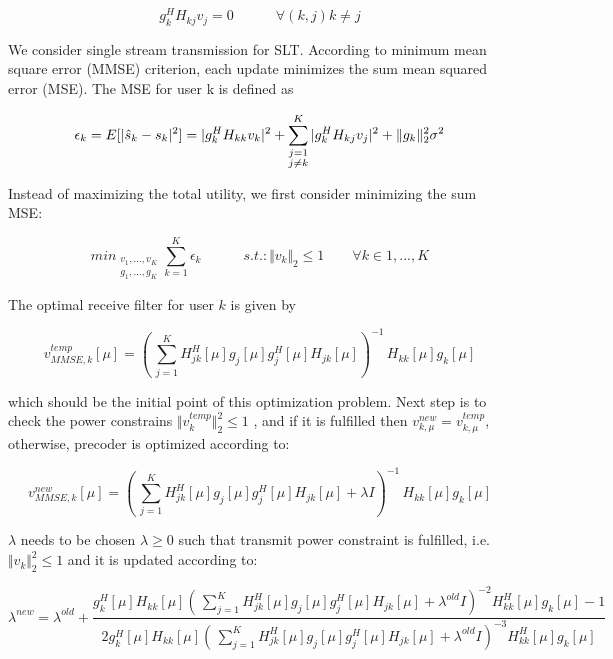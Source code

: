 \documentclass[12pt,a4paper,notitlepage,twoside,headsepline]{scrartcl}
\begin{document}
\begin{equation}
	g_{k}^{H} H_{kj} v_j = 0 \quad \quad \quad \forall (k,j) k \neq j
\end{equation}


We consider single stream transmission for SLT. According to minimum mean square error (MMSE) criterion, each
update minimizes the sum mean squared error (MSE). The MSE for user k is defined as

\begin{equation}
	\epsilon_k =  E[ |\hat{s}_k - s_k |^2 ] \\
	 = |g_{k}^{H} H_{kk} v_k|^2 + \sum_{\substack{j=1 \\ j \neq k}}^{K}{|g_{k}^{H} H_{kj} v_j|^2} + \Vert{g_k}\Vert_2^2 \sigma^2
\end{equation}

Instead of maximizing the total utility, we first consider minimizing the sum MSE:

\begin{equation}
	min_{\substack{v_1,...,v_K \\ g_1,...,g_K}} \sum_{k=1}^{K}{\epsilon_k}	\quad\quad\quad
	s.t.: \Vert v_k \Vert_2 \leq 1 \quad\quad \forall k \in {1,...,K}
\end{equation}

The optimal receive filter for user $k$ is given by

\begin{equation}
	v_{MMSE, k}^{temp}[\mu] = ( \, \sum_{j=1}^{K}{H_{jk}^{H}[\mu] g_j[\mu] g_j^H[\mu] H_{jk}[\mu]})^{-1} \, H_{kk}[\mu] g_k[\mu]
\end{equation}

which should be the initial point of this optimization problem. Next step is to check the power constrains $  \Vert v_k^{temp} \Vert_2^2  \leq 1$ , and if it is fulfilled then $ v_{k,\mu}^{new} = v_{k,\mu}^{temp}$, otherwise, precoder is optimized according to:

\begin{equation}
	v_{MMSE, k}^{new}[\mu] = ( \, \sum_{j=1}^{K}{H_{jk}^{H}[\mu] g_j[\mu] g_j^H[\mu] H_{jk}[\mu] + \lambda I})^{-1} \, H_{kk}[\mu] g_k[\mu]
\end{equation}

$\lambda$ needs to be chosen $ \lambda \geq 0 $ such that transmit power constraint is fulfilled, i.e. $ \Vert v_k \Vert_2^2  \leq 1$ and it is updated according to:

\begin{equation}
	\lambda^{new} = \lambda^{old} + \frac{g_k^H[\mu] H_{kk}[\mu] ( \, \sum_{j=1}^{K}{H_{jk}^{H}[\mu] g_j[\mu] g_j^H[\mu] H_{jk}[\mu] + \lambda^{old} I})^{-2} H_{kk}^H [\mu] g_k[\mu] - 1}{2g_k^H[\mu] H_{kk}[\mu] ( \, \sum_{j=1}^{K}{H_{jk}^{H}[\mu] g_j[\mu] g_j^H[\mu] H_{jk}[\mu] + \lambda^{old} I})^{-3} H_{kk}^H [\mu] g_k[\mu]}
\end{equation}
\end{document}
